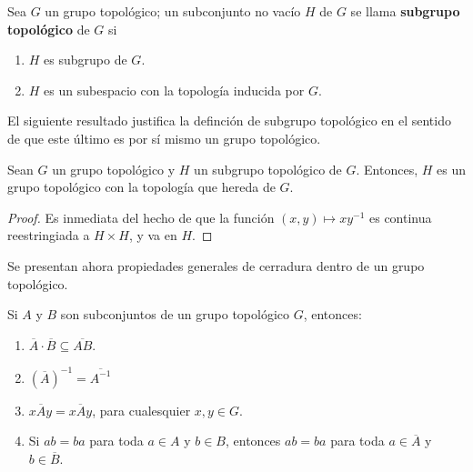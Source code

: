 \documentclass[12pt]{report}
\theoremstyle{largebreak}
\newcommand{\Cls}[1]{\ensuremath{\overline{#1}}}
\begin{document}
    \begin{mydef}
        Sea $G$ un grupo topológico; un subconjunto no vacío $H$ de $G$ se llama  \textbf{subgrupo topológico} de $G$ si
        \begin{enumerate}
            \item $H$ es subgrupo de $G$.
            \item $H$ es un subespacio con la topología inducida por $G$.
        \end{enumerate}
    \end{mydef}

    El siguiente resultado justifica la definción de subgrupo topológico en el sentido de que este último es por sí mismo un grupo topológico.
    
    \begin{propo}
        Sean $G$ un grupo topológico y $H$ un subgrupo topológico de $G$. Entonces, $H$ es un grupo topológico con la topología que hereda de $G$.
    \end{propo}

    \begin{proof}
        Es inmediata del hecho de que la función $(x,y)\mapsto xy^{-1}$ es continua reestringiada a $H\times H$, y va en $H$.
    \end{proof}

    Se presentan ahora propiedades generales de cerradura dentro de un grupo topológico.

    \begin{propo}
        Si $A$ y $B$ son subconjuntos de un grupo topológico $G$, entonces:
        \begin{enumerate}
            \item $\Cls{A}\cdot\Cls{B}\subseteq \Cls{AB}$.
            \item $(\Cls{A})^{-1}=\Cls{A^{-1}}$
            \item $x\Cls{A}y=\Cls{xAy}$, para cualesquier $x,y\in G$.
            \item Si $ab=ba$ para toda $a\in A$ y $b\in B$, entonces $ab=ba$ para toda $a\in\Cls{A}$ y $b\in\Cls{B}$.
        \end{enumerate}
    \end{propo}
\end{document}
